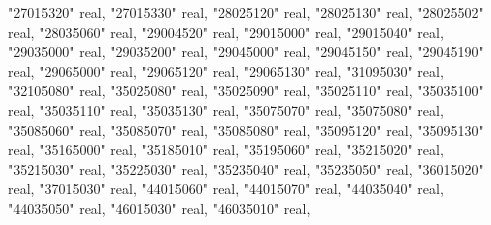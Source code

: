 \documentclass[12pt,twoside]{reedthesis}
\newenvironment{Shaded}{\begin{snugshade}}{\end{snugshade}}
\newcommand{\DataTypeTok}[1]{\textcolor[rgb]{0.13,0.29,0.53}{#1}}
\newcommand{\NormalTok}[1]{#1}
\newcommand{\OtherTok}[1]{\textcolor[rgb]{0.56,0.35,0.01}{#1}}
\begin{document}
\begin{Shaded}
\begin{Highlighting}[]
     \OtherTok{"27015320"} \DataTypeTok{real}\NormalTok{, }\OtherTok{"27015330"} \DataTypeTok{real}\NormalTok{, }\OtherTok{"28025120"} \DataTypeTok{real}\NormalTok{, }\OtherTok{"28025130"} \DataTypeTok{real}\NormalTok{, }\OtherTok{"28025502"} \DataTypeTok{real}\NormalTok{, }\OtherTok{"28035060"} \DataTypeTok{real}\NormalTok{, }
     \OtherTok{"29004520"} \DataTypeTok{real}\NormalTok{, }\OtherTok{"29015000"} \DataTypeTok{real}\NormalTok{, }\OtherTok{"29015040"} \DataTypeTok{real}\NormalTok{, }\OtherTok{"29035000"} \DataTypeTok{real}\NormalTok{, }\OtherTok{"29035200"} \DataTypeTok{real}\NormalTok{, }\OtherTok{"29045000"} \DataTypeTok{real}\NormalTok{, }
     \OtherTok{"29045150"} \DataTypeTok{real}\NormalTok{, }\OtherTok{"29045190"} \DataTypeTok{real}\NormalTok{, }\OtherTok{"29065000"} \DataTypeTok{real}\NormalTok{, }\OtherTok{"29065120"} \DataTypeTok{real}\NormalTok{, }\OtherTok{"29065130"} \DataTypeTok{real}\NormalTok{, }\OtherTok{"31095030"} \DataTypeTok{real}\NormalTok{, }
     \OtherTok{"32105080"} \DataTypeTok{real}\NormalTok{, }\OtherTok{"35025080"} \DataTypeTok{real}\NormalTok{, }\OtherTok{"35025090"} \DataTypeTok{real}\NormalTok{, }\OtherTok{"35025110"} \DataTypeTok{real}\NormalTok{, }\OtherTok{"35035100"} \DataTypeTok{real}\NormalTok{, }\OtherTok{"35035110"} \DataTypeTok{real}\NormalTok{, }
     \OtherTok{"35035130"} \DataTypeTok{real}\NormalTok{, }\OtherTok{"35075070"} \DataTypeTok{real}\NormalTok{, }\OtherTok{"35075080"} \DataTypeTok{real}\NormalTok{, }\OtherTok{"35085060"} \DataTypeTok{real}\NormalTok{, }\OtherTok{"35085070"} \DataTypeTok{real}\NormalTok{, }\OtherTok{"35085080"} \DataTypeTok{real}\NormalTok{, }
     \OtherTok{"35095120"} \DataTypeTok{real}\NormalTok{, }\OtherTok{"35095130"} \DataTypeTok{real}\NormalTok{, }\OtherTok{"35165000"} \DataTypeTok{real}\NormalTok{, }\OtherTok{"35185010"} \DataTypeTok{real}\NormalTok{, }\OtherTok{"35195060"} \DataTypeTok{real}\NormalTok{, }\OtherTok{"35215020"} \DataTypeTok{real}\NormalTok{, }
     \OtherTok{"35215030"} \DataTypeTok{real}\NormalTok{, }\OtherTok{"35225030"} \DataTypeTok{real}\NormalTok{, }\OtherTok{"35235040"} \DataTypeTok{real}\NormalTok{, }\OtherTok{"35235050"} \DataTypeTok{real}\NormalTok{, }\OtherTok{"36015020"} \DataTypeTok{real}\NormalTok{, }\OtherTok{"37015030"} \DataTypeTok{real}\NormalTok{, }
     \OtherTok{"44015060"} \DataTypeTok{real}\NormalTok{, }\OtherTok{"44015070"} \DataTypeTok{real}\NormalTok{, }\OtherTok{"44035040"} \DataTypeTok{real}\NormalTok{, }\OtherTok{"44035050"} \DataTypeTok{real}\NormalTok{, }\OtherTok{"46015030"} \DataTypeTok{real}\NormalTok{, }\OtherTok{"46035010"} \DataTypeTok{real}\NormalTok{, }

\end{Highlighting}
\end{Shaded}
\end{document}
